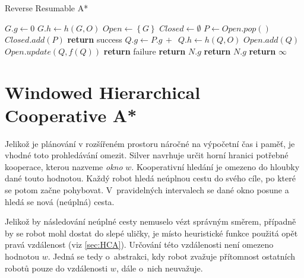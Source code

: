 \begin{algorithm}[H]
	\caption{Reverse Resumable A*}
	\label{alg:RRA}
	\begin{algorithmic}[1]
			\State $G.g\gets 0$
			\State $G.h\gets h(G,O)$
			\State $Open\gets\left\{ G \right\}$
			\State $Closed\gets\emptyset$
			\State {}
		\EndFunction
				\State $P\gets Open.pop()$
				\State $Closed.add(P)$
					\State \textbf{return} success
				\EndIf
					\State $Q.g\gets P.g\,+\,$
					\State $Q.h\gets h(Q,O)$
						\State $Open.add(Q)$
					\EndIf
						\State $Open.update(Q,f(Q))$
					\EndIf
				\EndFor
			\EndWhile
			\State \textbf{return} failure
		\EndFunction
				\State \textbf{return} $N.g$
			\EndIf
				\State \textbf{return} $N.g$
			\EndIf
			\State \textbf{return} $\infty$
		\EndFunction
	\end{algorithmic}
\end{algorithm}

\clearpage
\section{Windowed Hierarchical Cooperative A*}
Jelikož je plánování v rozšířeném prostoru náročné na výpočetní čas i paměť, je vhodné toto prohledávání omezit. Silver \cite{Silver2005} navrhuje určit horní hranici potřebné kooperace, kterou nazveme \emph{okno} $w$. Kooperativní hledání je omezeno do hloubky dané touto hodnotou. Každý robot hledá neúplnou cestu do svého cíle, po které se potom začne pohybovat. V~pravidelných intervalech se dané okno posune a hledá se nová (neúplná) cesta. 

Jelikož by následování neúplné cesty nemuselo vézt správným směrem, případně by se robot mohl dostat do slepé uličky, je místo heuristické funkce použitá opět pravá vzdálenost (viz \ref{sec:HCA}). Určování této vzdálenosti není omezeno hodnotou $w$. Jedná se tedy o~abstrakci, kdy robot zvažuje přítomnost ostatních robotů pouze do vzdálenosti $w$, dále o~nich neuvažuje.

